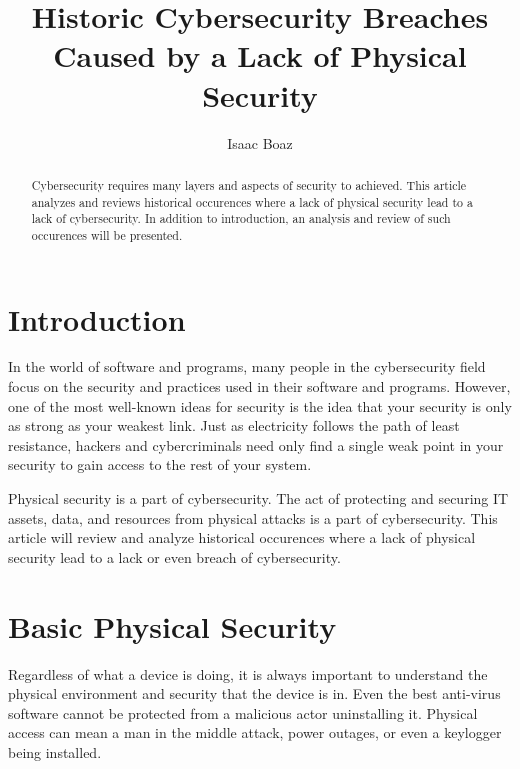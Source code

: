 \documentclass[acmlarge]{acmart}
\begin{document}
\title{Historic Cybersecurity Breaches Caused by a Lack of Physical Security}

\author{Isaac Boaz}


\renewcommand{\shortauthors}{Boaz}

\begin{abstract}
  Cybersecurity requires many layers and aspects of security to achieved.
  This article analyzes and reviews historical occurences where a lack of
  physical security lead to a lack of cybersecurity. In addition to introduction,
  an analysis and review of such occurences will be presented.
\end{abstract}


\maketitle

\section{Introduction}
In the world of software and programs, many people in the cybersecurity
field focus on the security and practices used in their software and programs.
However, one of the most well-known ideas for security is the idea that
your security is only as strong as your weakest link. Just as electricity
follows the path of least resistance, hackers and cybercriminals need only
find a single weak point in your security to gain access to the rest of
your system.

Physical security is a part of cybersecurity. The act of protecting and
securing IT assets, data, and resources from physical attacks is a part
of cybersecurity. This article will review and analyze historical
occurences where a lack of physical security lead to a lack or even breach
of cybersecurity.

\section{Basic Physical Security}
Regardless of what a device is doing, it is always important to understand
the physical environment and security that the device is in. Even the
best anti-virus software cannot be protected from a malicious actor
uninstalling it. Physical access can mean a man in the middle attack,
power outages, or even a keylogger being installed. 
\end{document}
